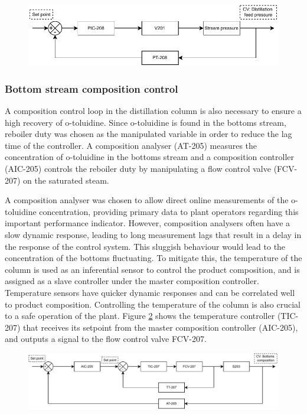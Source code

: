 \begin{figure}[H]
    \centering
    \includegraphics[width=\linewidth]{chapters/4-operation-control/4-Figures/V201-PC.pdf}
    \caption{}
    \label{fig:V201-PC}
\end{figure}


\subsubsection{Bottom stream composition control}
A composition control loop in the distillation column is also necessary to ensure a high recovery of o-toluidine. Since o-toluidine is found in the bottoms stream, reboiler duty was chosen as the manipulated variable in order to reduce the lag time of the controller. A composition analyser (AT-205) measures the concentration of o-toluidine in the bottoms stream and a composition controller (AIC-205) controls the reboiler duty by manipulating a flow control valve (FCV-207) on the saturated steam. 

A composition analyser was chosen to allow direct online measurements of the o-toluidine concentration, providing primary data to plant operators regarding this important performance indicator. However, composition analysers often have a slow dynamic response, leading to long measurement lags that result in a delay in the response of the control system. This sluggish behaviour would lead to the concentration of the bottoms fluctuating. To mitigate this, the temperature of the column is used as an inferential sensor to control the product composition, and is assigned as a slave controller under the master composition controller. Temperature sensors have quicker dynamic responses and can be correlated well to product composition. Controlling the temperature of the column is also crucial to a safe operation of the plant. Figure \ref{fig:S203-CC} shows the temperature controller (TIC-207) that receives its setpoint from the master composition controller (AIC-205), and outputs a signal to the flow control valve FCV-207.

\begin{figure}[H]
    \centering
    \includegraphics[width=\linewidth]{chapters/4-operation-control/4-Figures/S203-CC.pdf}
    \caption{}
    \label{fig:S203-CC}
\end{figure}


